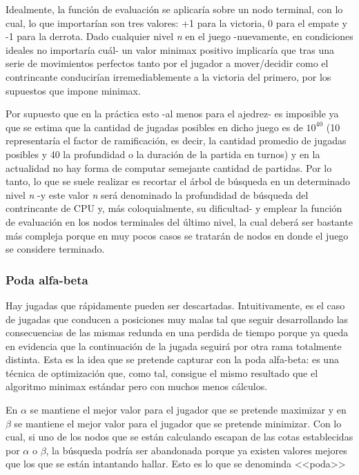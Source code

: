 \documentclass{llncs}
\begin{document}
Idealmente, la función de evaluación se aplicaría sobre un nodo terminal, con lo cual, lo que importarían son tres valores: +1 para la victoria, 0 para el empate y -1 para la derrota. Dado cualquier nivel \textit{n} en el juego -nuevamente, en condiciones ideales no importaría cuál- un valor minimax positivo implicaría que tras una serie de movimientos perfectos tanto por el jugador a mover/decidir como el contrincante conducirían irremediablemente a la victoria del primero, por los supuestos que impone minimax.

Por supuesto que en la práctica esto -al menos para el ajedrez- es imposible ya que se estima que la cantidad de jugadas posibles en dicho juego es de $10^{40}$ (10 representaría el factor de ramificación, es decir, la cantidad promedio de jugadas posibles y 40 la profundidad o la duración de la partida en turnos) y en la actualidad no hay forma de computar semejante cantidad de partidas. Por lo tanto, lo que se suele realizar es recortar el árbol de búsqueda en un determinado nivel \textit{n} -y este valor \textit{n} será denominado la profundidad de búsqueda del contrincante de CPU y, más coloquialmente, su dificultad- y emplear la función de evaluación en los nodos terminales del último nivel, la cual deberá ser bastante más compleja porque en muy pocos casos se tratarán de nodos en donde el juego se considere terminado.


\subsubsection{ Poda alfa-beta }

Hay jugadas que rápidamente pueden ser descartadas. Intuitivamente, es el caso de jugadas que conducen a posiciones muy malas tal que seguir desarrollando las consecuencias de las mismas redunda en una perdida de tiempo porque ya queda en evidencia que la continuación de la jugada seguirá por otra rama totalmente distinta. Esta es la idea que se pretende capturar con la poda alfa-beta: es una técnica de optimización que, como tal, consigue el mismo resultado que el algoritmo minimax estándar pero con muchos menos cálculos.

En $\alpha$ se mantiene el mejor valor para el jugador que se pretende maximizar y en $\beta$ se mantiene el mejor valor para el jugador que se pretende minimizar. Con lo cual, si uno de los nodos que se están calculando escapan de las cotas establecidas por $\alpha$ o $\beta$, la búsqueda podría ser abandonada porque ya existen valores mejores que los que se están intantando hallar. Esto es lo que se denominda <<poda>>
\end{document}
